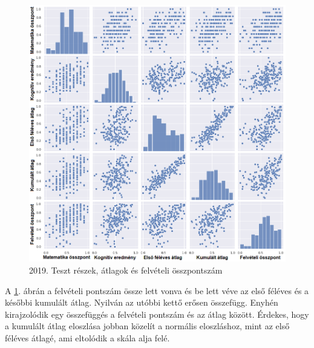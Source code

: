 \documentclass[12pt]{article}
\begin{document}
\begin{figure}[H]
\centering
\includegraphics[width=\textwidth]{kepek/2019minmax4.png}
\caption{2019. Teszt részek, átlagok és felvételi összpontszám}
\label{fig:2019minmax4}
\end{figure}

A \ref{fig:2019minmax4}. ábrán a felvételi pontszám össze lett vonva és be lett véve az első féléves és a későbbi kumulált átlag. Nyilván az utóbbi kettő erősen összefügg. Enyhén kirajzolódik egy összefüggés a felvételi pontszám és az átlag között. Érdekes, hogy a kumulált átlag eloszlása jobban közelít a normális eloszláshoz, mint az első féléves átlagé, ami eltolódik a skála alja felé.
\end{document}
